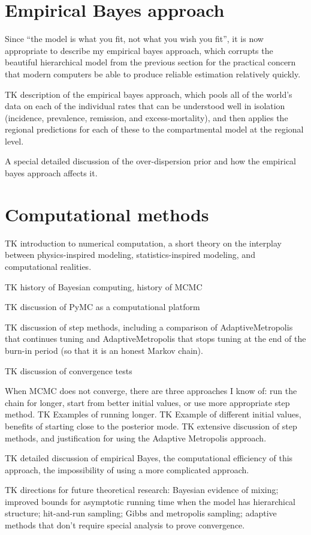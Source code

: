 \section{Empirical Bayes approach}
Since ``the model is what you fit, not what you wish you fit'', it is
now appropriate to describe my empirical bayes approach, which
corrupts the beautiful hierarchical model from the previous section
for the practical concern that modern computers be able to produce
reliable estimation relatively quickly.

TK description of the empirical bayes approach, which pools all of the
world's data on each of the individual rates that can be understood
well in isolation (incidence, prevalence, remission, and
excess-mortality), and then applies the regional predictions for each
of these to the compartmental model at the regional level.

A special detailed discussion of the over-dispersion prior and how the
empirical bayes approach affects it.


\section{Computational methods}
TK introduction to numerical computation, a short theory on the
interplay between physics-inspired modeling, statistics-inspired
modeling, and computational realities.

TK history of Bayesian computing, history of MCMC

TK discussion of PyMC as a computational platform

TK discussion of step methods, including a comparison of
AdaptiveMetropolis that continues tuning and AdaptiveMetropolis that
stops tuning at the end of the burn-in period (so that it is an honest
Markov chain).

TK discussion of convergence tests

When MCMC does not converge, there are three approaches I know of: run
the chain for longer, start from better initial values, or use more
appropriate step method. TK Examples of running longer. TK Example of
different initial values, benefits of starting close to the posterior
mode. TK extensive discussion of step methods, and justification for
using the Adaptive Metropolis approach.

TK detailed discussion of empirical Bayes, the computational
efficiency of this approach, the impossibility of using a more
complicated approach.

TK directions for future theoretical research: Bayesian evidence of
mixing; improved bounds for asymptotic running time when the model has
hierarchical structure; hit-and-run sampling; Gibbs and metropolis
sampling; adaptive methods that don't require special analysis to
prove convergence.



